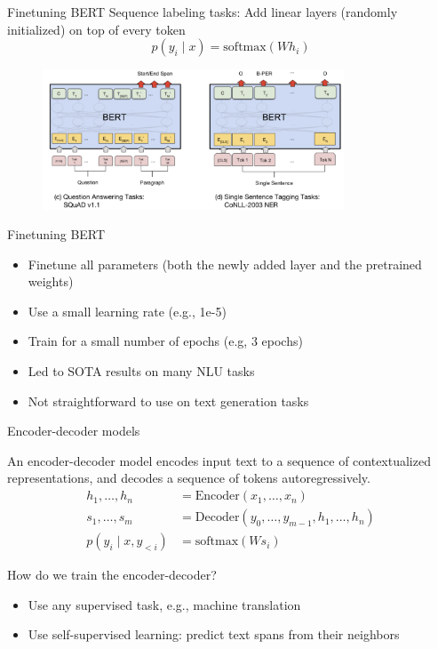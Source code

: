 \documentclass[usenames,dvipsnames,notes,11pt,aspectratio=169,hyperref={colorlinks=true, linkcolor=blue}]{beamer}
\begin{document}
\begin{frame}
    {Finetuning BERT}
        Sequence labeling tasks:
            Add linear layers (randomly initialized) on top of every token 
            $$
            p(y_i \mid x) = \mathrm{softmax}(Wh_{i})
            $$
            \begin{figure}
                \includegraphics[width=0.8\textwidth]{figures/bert-seq-label}
            \end{figure}
\end{frame}

\begin{frame}
    {Finetuning BERT}

    \begin{itemize}
        \item Finetune all parameters (both the newly added layer and the pretrained weights)
        \item Use a small learning rate (e.g., 1e-5)
        \item Train for a small number of epochs (e.g, 3 epochs)
        \item Led to SOTA results on many NLU tasks
        \item Not straightforward to use on text generation tasks
    \end{itemize}
\end{frame}

\begin{frame}
    {Encoder-decoder models}

    An encoder-decoder model encodes input text to a sequence of contextualized representations, and decodes a sequence of tokens autoregressively.
    \begin{align*}
        h_1,\ldots,h_n &= \mathrm{Encoder}(x_1,\ldots,x_n) \\
        s_1,\ldots,s_m &= \mathrm{Decoder}(y_0,\ldots,y_{m-1}, h_1,\ldots,h_n)\\
        p(y_i\mid x, y_{<i}) &= \mathrm{softmax}(Ws_i)
    \end{align*}

    How do we train the encoder-decoder?
    \begin{itemize}
        \item Use any supervised task, e.g., machine translation 
        \item Use self-supervised learning: predict text spans from their neighbors 
    \end{itemize}
\end{frame}
\end{document}
